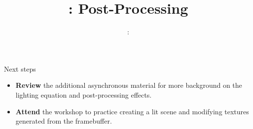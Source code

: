 \usepackage{../../beamerthemeFalmouthGamesAcademy}
\usepackage{multimedia}
\graphicspath{ {../../} }




\usepackage[normalem]{ulem}
\usepackage{wasysym}

\usepackage{pdfpages}

\usepackage{caption}
\captionsetup[figure]{font=scriptsize,labelfont=scriptsize}

\usetikzlibrary{arrows,automata}




\title{\sessionnumber: Post-Processing}
\subtitle{\modulecode: \moduletitle}

\frame{\titlepage} 







\begin{frame}{Next steps}
	\begin{itemize}
		\item \textbf{Review} the additional asynchronous material for more background on the lighting equation and post-processing effects.
		\item \textbf{Attend} the workshop to practice creating a lit scene and modifying textures generated from the framebuffer.
	\end{itemize}
\end{frame}



